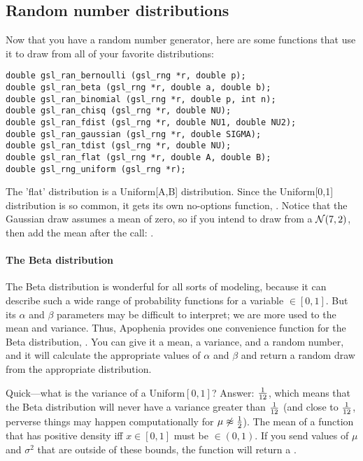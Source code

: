 \subsection{Random number distributions}
Now that you have a random number generator, here are some functions that use it to draw from all of your favorite distributions:
  
   

\begin{lstlisting}
double gsl_ran_bernoulli (gsl_rng *r, double p);
double gsl_ran_beta (gsl_rng *r, double a, double b);
double gsl_ran_binomial (gsl_rng *r, double p, int n);
double gsl_ran_chisq (gsl_rng *r, double NU);
double gsl_ran_fdist (gsl_rng *r, double NU1, double NU2);
double gsl_ran_gaussian (gsl_rng *r, double SIGMA);
double gsl_ran_tdist (gsl_rng *r, double NU);
double gsl_ran_flat (gsl_rng *r, double A, double B);
double gsl_rng_uniform (gsl_rng *r);
\end{lstlisting}

The 'flat' distribution is a Uniform[A,B] distribution. Since the
Uniform[0,1] distribution is so common, it gets its own no-options
function, . Notice that the Gaussian draw
assumes a mean of zero, so if you intend to draw from a ${\cal N}(7,2)$,
then add the mean after the call: .

\paragraph{The Beta distribution}\label{beta}
The Beta distribution is wonderful for all sorts of modeling, because
it can describe such a wide range of probability functions for a
variable $\in [0,1]$.  But its $\alpha$ and $\beta$ parameters may be
difficult to interpret; we are more used to the mean and variance. Thus,
Apophenia provides one convenience function for the Beta distribution,
. You can give it a mean, a variance, and
a random number, and it will calculate the appropriate values of $\alpha$
and $\beta$ and return a random draw from the appropriate distribution.

Quick---what is the variance of a Uniform$[0,1]$? Answer: ${1\over 12}$,
which means that the Beta distribution will never have a variance greater
than ${1\over 12}$ (and close to ${1\over 12}$, perverse things may
happen computationally for $\mu \not\approx {1\over 2}$). The mean of a
function that has positive density iff $x \in [0,1]$ must be
$\in (0,1)$. If you send  values of $\mu$
and $\sigma^2$ that are outside of these bounds, the function will
return a .

